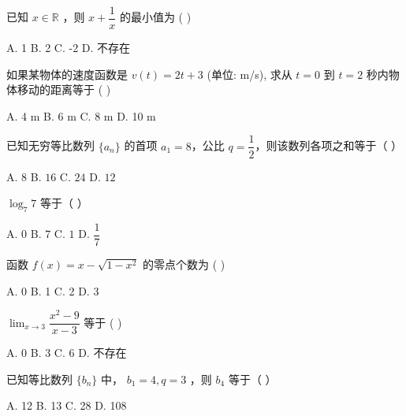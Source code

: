 \documentclass[11pt, a4paper]{article}
\begin{document}

\begin{baitap}[1]
已知 $x \in \mathbb{R}$ ，则 $x + \dfrac{1}{x}$ 的最小值为 ( )
\par\vspace{3pt}
\noindent A. 1 \quad B. 2 \quad C. -2 \quad D. 不存在
\end{baitap}

\begin{baitap}[2]
如果某物体的速度函数是 $v(t) = 2t + 3$ (单位: m/s), 求从 $t = 0$ 到 $t = 2$ 秒内物体移动的距离等于 ( )
\par\vspace{3pt}
\noindent A. 4 m \quad B. 6 m \quad C. 8 m \quad D. 10 m
\end{baitap}

\begin{baitap}[3]
已知无穷等比数列 $\{a_n\}$ 的首项 $a_1 = 8$，公比 $q = \dfrac{1}{2}$，则该数列各项之和等于（ ）
\par\vspace{3pt}
\noindent A. $8$ \quad B. $16$ \quad C. $24$ \quad D. $12$
\end{baitap}

\begin{baitap}[4]
$\log_7 7$ 等于（ ）
\par\vspace{3pt}
\noindent A. $0$ \quad B. $7$ \quad C. $1$ \quad D. $\dfrac{1}{7}$
\end{baitap}

\begin{baitap}[5]
函数 $f(x) = x - \sqrt{1 - x^2}$ 的零点个数为 ( )
\par\vspace{3pt}
\noindent A. 0 \quad B. 1 \quad C. 2 \quad D. 3
\end{baitap}

\begin{baitap}[6]
$\lim_{x\to 3} \dfrac{x^2-9}{x-3}$ 等于 ( )
\par\vspace{3pt}
\noindent A. 0 \quad B. 3 \quad C. 6 \quad D. 不存在
\end{baitap}

\begin{baitap}[7]
已知等比数列 $\{b_n\}$ 中， $b_1 = 4, q = 3$ ，则 $b_4$ 等于（ ）
\par\vspace{3pt}
\noindent A. 12 \quad B. 13 \quad C. 28 \quad D. 108
\end{baitap}
\end{document}
